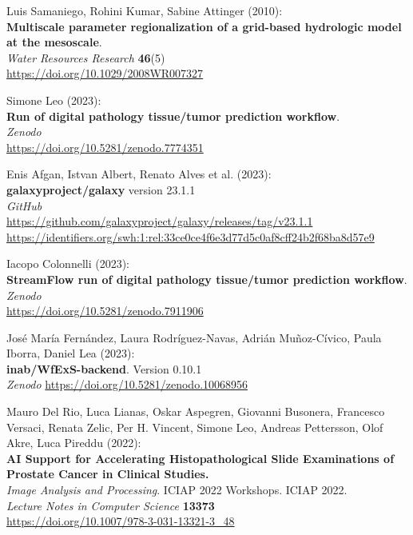 \documentclass[10pt,letterpaper]{article}
\begin{document}
\begin{thebibliography}{10}
\begin{small}
Luis Samaniego, Rohini Kumar, Sabine Attinger (2010):\\
\textbf{Multiscale parameter regionalization of a grid-based hydrologic model at the mesoscale}.\\
\emph{Water Resources Research} \textbf{46}(5)\\
\url{https://doi.org/10.1029/2008WR007327}

Simone Leo (2023):\\
\textbf{Run of digital pathology tissue/tumor prediction workflow}.\\
\emph{Zenodo}\\
\url{https://doi.org/10.5281/zenodo.7774351}

Enis Afgan, Istvan Albert, Renato Alves et al. (2023):\\
\textbf{galaxyproject/galaxy} version 23.1.1\\
\emph{GitHub}\\
\url{https://github.com/galaxyproject/galaxy/releases/tag/v23.1.1}\\
\url{https://identifiers.org/swh:1:rel:33ce0ce4f6e3d77d5c0af8cff24b2f68ba8d57e9}

Iacopo Colonnelli (2023):\\
\textbf{StreamFlow run of digital pathology tissue/tumor prediction workflow}.\\
\emph{Zenodo}\\
\url{https://doi.org/10.5281/zenodo.7911906}

José María Fernández, Laura Rodríguez-Navas, Adrián Muñoz-Cívico, Paula Iborra, Daniel Lea (2023):\\
\textbf{inab/WfExS-backend}. Version 0.10.1\\
\emph{Zenodo}
\url{https://doi.org/10.5281/zenodo.10068956}

Mauro Del Rio, Luca Lianas, Oskar Aspegren, Giovanni Busonera, Francesco Versaci, Renata Zelic, Per H. Vincent, Simone Leo, Andreas Pettersson, Olof Akre, Luca Pireddu (2022):\\
\textbf{AI Support for Accelerating Histopathological Slide Examinations of Prostate Cancer in Clinical Studies.}\\
\emph{Image Analysis and Processing}. ICIAP 2022 Workshops. ICIAP 2022. \\
\emph{Lecture Notes in Computer Science} \textbf{13373}\\
\url{https://doi.org/10.1007/978-3-031-13321-3_48}


\end{small}
\end{thebibliography}
\end{document}
